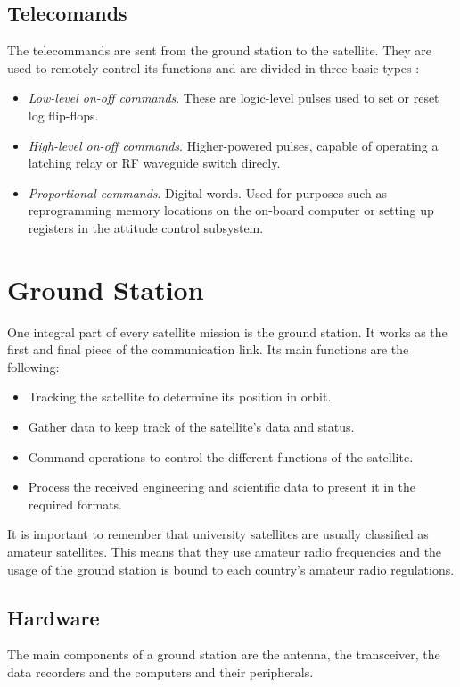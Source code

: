 \subsection{Telecomands}
The telecommands are sent from the ground station to the satellite. They are used to remotely control its functions and are divided in three basic types \cite{SSEng}:
\begin{itemize}
\item \emph{Low-level on-off commands}. These are logic-level pulses used to set or reset log flip-flops.
\item \emph{High-level on-off commands}. Higher-powered pulses, capable of operating a latching relay or RF waveguide switch direcly.
\item \emph{Proportional commands}. Digital words. Used for purposes such as reprogramming memory locations on the on-board computer or setting up registers in the attitude control subsystem.

\end{itemize}

\section{Ground Station}
One integral part of every satellite mission is the ground station. It works as the first and final piece of the communication link. Its main functions are the following:
\begin{itemize}
\item Tracking the satellite to determine its position in orbit.
\item Gather data to keep track of the satellite's data and status.
\item Command operations to control the different functions of the satellite.
\item Process the received engineering and scientific data to present it in the required formats.
\end{itemize}

It is important to remember that university satellites are usually classified as amateur satellites. This means that they use amateur radio frequencies and the usage of the ground station is bound to each country's amateur radio regulations.

\subsection{Hardware}

The main components of a ground station are the antenna, the transceiver, the data recorders and the computers and their peripherals.
\pagebreak
